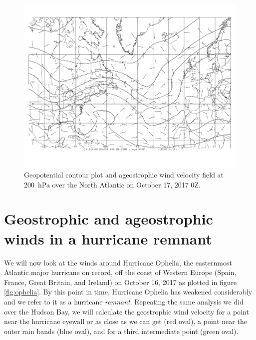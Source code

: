\documentclass[11pt]{article}
\begin{document}
\begin{figure}[h!]
	\centering
	\includegraphics[trim={0.5cm 2cm 0.5cm 0},clip,width=\textwidth]{200hPa_hght_agewind_jet_inout}
	\caption{Geopotential contour plot and ageostrophic wind velocity field at \SI{200}{\hecto\Pa} over the North Atlantic on October 17, 2017 0Z.}
	\label{fig:jet_age}
\end{figure}

\section{Geostrophic and ageostrophic winds in a hurricane remnant}
We will now look at the winds around Hurricane Ophelia, the easternmost Atlantic major hurricane on record, off the coast of Western Europe (Spain, France, Great Britain, and Ireland) on October 16, 2017 as plotted in figure \ref{fig:ophelia}. By this point in time, Hurricane Ophelia has weakened considerably and we refer to it as a hurricane \emph{remnant}. Repeating the same analysis we did over the Hudson Bay, we will calculate the geostrophic wind velocity for a point near the hurricane eyewall or as close as we can get (red oval), a point near the outer rain bands (blue oval), and for a third intermediate point (green oval).
\end{document}
